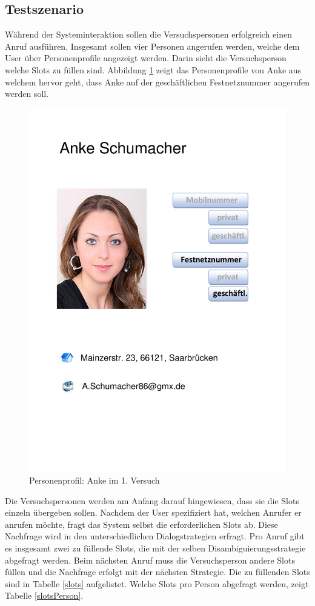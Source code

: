 \documentclass[12pt,a4paper]{scrartcl}
\begin{document}
\subsection{Testszenario}
\label{testszenario1}
Während der Systeminteraktion sollen die Versuchspersonen erfolgreich einen Anruf ausführen. Insgesamt sollen vier Personen angerufen werden, welche dem User über Personenprofile angezeigt werden.  Darin sieht die Versuchsperson welche Slots zu füllen sind. Abbildung \ref{anke} zeigt das Personenprofile von Anke aus welchem hervor geht, dass Anke auf der geschäftlichen Festnetznummer angerufen werden soll. 
\begin{figure}[htbp]
\begin{center}
\includegraphics[width=12cm]{Anke.pdf}
\caption{Personenprofil: Anke im 1. Versuch}
\label{anke}
\end{center}
\end{figure}
Die Versuchspersonen werden am Anfang darauf hingewiesen, dass sie die Slots einzeln übergeben sollen. Nachdem der User spezifiziert hat, welchen Anrufer er anrufen möchte, fragt das System selbst die erforderlichen Slots ab. Diese Nachfrage wird in den unterschiedlichen Dialogstrategien erfragt. Pro Anruf gibt es insgesamt zwei zu füllende Slots, die mit der selben Disambiguierungsstrategie abgefragt werden. Beim nächsten Anruf muss die Versuchsperson andere Slots füllen und die Nachfrage erfolgt mit der nächsten Strategie. 
Die zu füllenden Slots sind in Tabelle \ref{slots} aufgelistet. Welche Slots pro Person abgefragt werden, zeigt Tabelle \ref{slotsPerson}.
\end{document}
